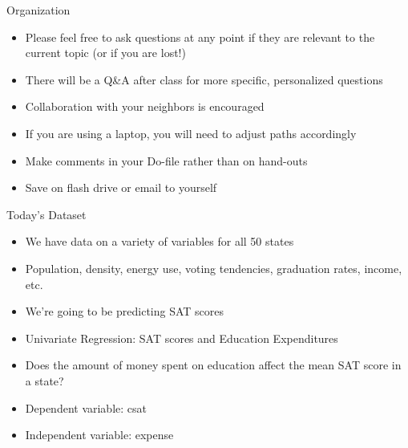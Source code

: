 \documentclass[table,smaller]{beamer}
\begin{document}
\begin{frame}[label=sec-1-2]{Organization}
\begin{itemize}
\item Please feel free to ask questions at any point if they are relevant to the current topic (or if you are lost!)
\item There will be a Q\&A after class for more specific, personalized questions
\item Collaboration with your neighbors is encouraged
\item If you are using a laptop, you will need to adjust paths accordingly
\item Make comments in your Do-file rather than on hand-outs
\item Save on flash drive or email to yourself
\end{itemize}
\end{frame}
\begin{frame}[label=sec-1-3]{Today's Dataset}
\begin{itemize}
\item We have data on a variety of variables for all 50 states
\item Population, density, energy use, voting tendencies, graduation rates, income, etc.
\item We're going to be predicting SAT scores
\item Univariate Regression: SAT scores and Education Expenditures
\item Does the amount of money spent on education affect the mean SAT score in a state?
\item Dependent variable: csat
\item Independent variable: expense
\end{itemize}
\end{frame}
\end{document}
